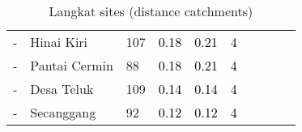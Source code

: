 \begin{table}[ht]
\begin{tabular}{C{0.05\textwidth}C{0.15\textwidth}C{0.08\textwidth}C{0.08\textwidth}C{0.08\textwidth}C{0.08\textwidth}C{0.08\textwidth}C{0.08\textwidth}C{0.08\textwidth}C{0.08\textwidth}}
  {-} & Hinai Kiri & 107 & \textcolor[HTML]{000000}{0.18} & \textcolor[HTML]{000000}{0.21} & \textcolor[HTML]{000000}{4} &  &  &  &  \\ 
  {-} & Pantai Cermin &  88 & \textcolor[HTML]{000000}{0.18} & \textcolor[HTML]{000000}{0.21} & \textcolor[HTML]{000000}{4} &  &  &  &  \\ 
  {-} & Desa Teluk & 109 & \textcolor[HTML]{000000}{0.14} & \textcolor[HTML]{000000}{0.14} & \textcolor[HTML]{000000}{4} &  &  &  &  \\ 
  {-} & Secanggang &  92 & \textcolor[HTML]{000000}{0.12} & \textcolor[HTML]{000000}{0.12} & \textcolor[HTML]{000000}{4} &  &  &  &  \\ 
  \end{tabular}
\endgroup
\caption{Langkat sites (distance catchments)} 
\end{table}
